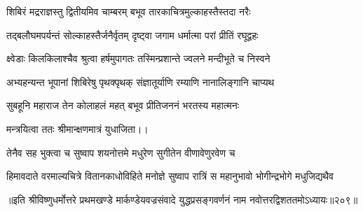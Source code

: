 \twolineshloka
{शिबिरं मद्रराज्ञस्तु द्वितीयमिव चाम्बरम्}
{बभूव तारकाचित्रमुल्काहस्तैस्तदा नरैः}%

\twolineshloka
{तद्बलौघमपर्यन्तं सोल्काहस्तैर्जनैर्वृतम्}
{दृष्ट्वा जगाम धर्मात्मा परां प्रीतिं रघूद्वहः}%

\twolineshloka
{क्ष्वेडाः किलकिलाश्चैव श्रुत्वा हर्षमुपागतः}
{तस्मिन्प्रशान्ते ज्वलने मन्दीभूते च निस्वने}%

\twolineshloka
{अभ्यहन्यन्त भूपानां शिबिरेषु पृथक्पृथक्}
{संज्ञातूर्याणि रम्याणि नानालिङ्गानि चाप्यथ}%

\twolineshloka
{सुबहूनि महाराज तेन कोलाहलं महत्}
{बभूव प्रीतिजननं भरतस्य महात्मनः}%

मन्त्रयित्वा ततः श्रीमान्क्षणमात्रं युधाजिता।।

\twolineshloka
{तेनैव सह भुक्त्वा च सुष्वाप शयनोत्तमे}
{मधुरेण सुगीतेन वीणावेणुरवेण च}%

\twolineshloka
{हिमावदाते वरमाल्यचित्रे वितानकाधोविहिते मनोज्ञे}
{सुष्वाप रात्रिं स महानुभावो भोगीन्द्रभोगे मधुजिद्यथैव}%

॥इति श्रीविष्णुधर्मोत्तरे प्रथमखण्डे मार्कण्डेयवज्रसंवादे युद्धप्रसङ्गवर्णनं नाम नवोत्तरद्विशततमोऽध्यायः॥२०९॥
